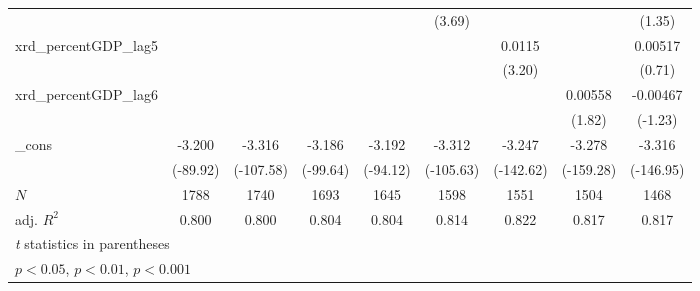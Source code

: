 {\begin{tabular}{l*{8}{c}}
          &                  &                  &                  &                  &   (3.69)         &                  &                  &   (1.35)         \\
\addlinespace
xrd\_percentGDP\_lag5&                  &                  &                  &                  &                  &   0.0115\sym{**} &                  &  0.00517         \\
          &                  &                  &                  &                  &                  &   (3.20)         &                  &   (0.71)         \\
\addlinespace
xrd\_percentGDP\_lag6&                  &                  &                  &                  &                  &                  &  0.00558         & -0.00467         \\
          &                  &                  &                  &                  &                  &                  &   (1.82)         &  (-1.23)         \\
\addlinespace
\_cons    &   -3.200\sym{***}&   -3.316\sym{***}&   -3.186\sym{***}&   -3.192\sym{***}&   -3.312\sym{***}&   -3.247\sym{***}&   -3.278\sym{***}&   -3.316\sym{***}\\
          & (-89.92)         &(-107.58)         & (-99.64)         & (-94.12)         &(-105.63)         &(-142.62)         &(-159.28)         &(-146.95)         \\
\midrule
\(N\)     &     1788         &     1740         &     1693         &     1645         &     1598         &     1551         &     1504         &     1468         \\
adj. \(R^{2}\)&    0.800         &    0.800         &    0.804         &    0.804         &    0.814         &    0.822         &    0.817         &    0.817         \\
\bottomrule
\multicolumn{9}{l}{\footnotesize \textit{t} statistics in parentheses}\\
\multicolumn{9}{l}{\footnotesize \sym{*} \(p<0.05\), \sym{**} \(p<0.01\), \sym{***} \(p<0.001\)}\\
\end{tabular}
}
